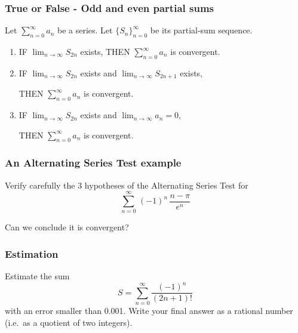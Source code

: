 \documentclass[14pt]{beamer}
\begin{document}
	\begin{frame}[t]
		\fontsize{12}{12}\selectfont
		\frametitle{True or False - Odd and even partial sums}

		Let $\displaystyle \sum_{n=0}^{\infty}a_{n}$ be a series. Let
		$\displaystyle \{ S_{n}\}_{n=0}^{\infty}$ be its partial-sum sequence.

		\begin{enumerate}
			\item IF $\displaystyle \lim_{n \to \infty}S_{2n}$ exists, \quad THEN \;
				{\color{blue} $\displaystyle \sum_{n=0}^{\infty}a_{n}$ is convergent}.
				\vspace{.5cm}

			\item IF $\displaystyle \lim_{n \to \infty}S_{2n}$ exists \; and \; $\displaystyle
				\lim_{n \to \infty}S_{2n+1}$ exists,

				THEN \; {\color{blue} $\displaystyle \sum_{n=0}^{\infty}a_{n}$ is convergent}.
				\vspace{.5cm}

			\item IF $\displaystyle \lim_{n \to \infty}S_{2n}$ exists \; and \; $\displaystyle
				\lim_{n \to \infty}a_{n}= 0$,

				THEN \; {\color{blue} $\displaystyle \sum_{n=0}^{\infty}a_{n}$ is convergent}.
		\end{enumerate}
	\end{frame}

	\begin{frame}[t]
		\frametitle{ An Alternating Series Test example}

		Verify carefully the 3 hypotheses of the Alternating Series Test for
		\[
			\sum_{n=0}^{\infty}\, (-1)^{n}\, \frac{n - \pi}{e^{n}}
		\]

		Can we conclude it is convergent?
	\end{frame}

	\begin{frame}[t]
		\frametitle{Estimation}

		Estimate the sum
		\[
			S = \sum_{n=0}^{\infty}\frac{(-1)^{n}}{(2n+1)!}
		\]
		with an error smaller than 0.001. Write your final answer as a rational number
		(i.e.\ as a quotient of two integers).
	\end{frame}
\end{document}
